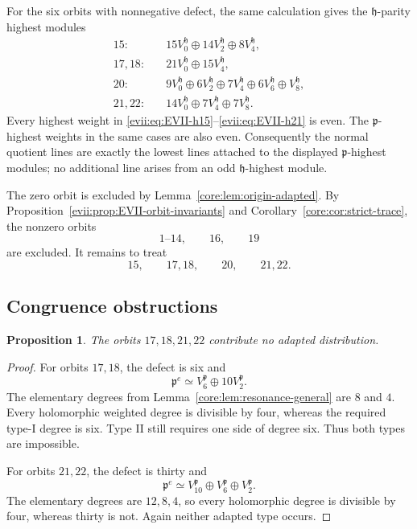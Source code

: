 \documentclass[10pt,a4paper]{amsart}
\numberwithin{equation}{section}
\newtheorem{proposition}[theorem]{Proposition}
\newcommand{\fh}{\mathfrak h}
\newcommand{\fp}{\mathfrak p}
\begin{document}
For the six orbits with nonnegative defect, the same calculation gives the
$\fh$-parity highest modules
\begin{align}
15:&\quad 15V_0^{\fh}\oplus14V_2^{\fh}\oplus8V_4^{\fh},
\label{evii:eq:EVII-h15}\\
17,18:&\quad 21V_0^{\fh}\oplus15V_4^{\fh},
\label{evii:eq:EVII-h17}\\
20:&\quad 9V_0^{\fh}\oplus6V_2^{\fh}\oplus7V_4^{\fh}
       \oplus6V_6^{\fh}\oplus V_8^{\fh},
\label{evii:eq:EVII-h20}\\
21,22:&\quad 14V_0^{\fh}\oplus7V_4^{\fh}\oplus7V_8^{\fh}.
\label{evii:eq:EVII-h21}
\end{align}
Every highest weight in \eqref{evii:eq:EVII-h15}--\eqref{evii:eq:EVII-h21} is even.
The $\fp$-highest weights in the same cases are also even.  Consequently the
normal quotient lines are exactly the lowest lines attached to the displayed
$\fp$-highest modules; no additional line arises from an odd
$\fh$-highest module.

The zero orbit is excluded by Lemma~\ref{core:lem:origin-adapted}.  By
Proposition~\ref{evii:prop:EVII-orbit-invariants} and
Corollary~\ref{core:cor:strict-trace}, the nonzero orbits
\begin{equation}\label{evii:eq:EVII-strict-orbits}
 1\text{--}14,\qquad16,\qquad19
\end{equation}
are excluded.  It remains to treat
\begin{equation}\label{evii:eq:EVII-remaining-orbits}
 15,\qquad17,18,\qquad20,\qquad21,22.
\end{equation}

\subsection{Congruence obstructions}

\begin{proposition}\label{evii:prop:EVII-congruence}
The orbits $17,18,21,22$ contribute no adapted distribution.
\end{proposition}

\begin{proof}
For orbits $17,18$, the defect is six and
\[
 \fp^e\simeq V_6^{\fp}\oplus10V_2^{\fp}.
\]
The elementary degrees from Lemma~\ref{core:lem:resonance-general} are $8$ and
$4$.  Every holomorphic weighted degree is divisible by four, whereas the
required type-I degree is six.  Type II still requires one side of degree six.
Thus both types are impossible.

For orbits $21,22$, the defect is thirty and
\[
 \fp^e\simeq V_{10}^{\fp}\oplus V_6^{\fp}\oplus V_2^{\fp}.
\]
The elementary degrees are $12,8,4$, so every holomorphic degree is divisible
by four, whereas thirty is not.  Again neither adapted type occurs.
\end{proof}
\end{document}
